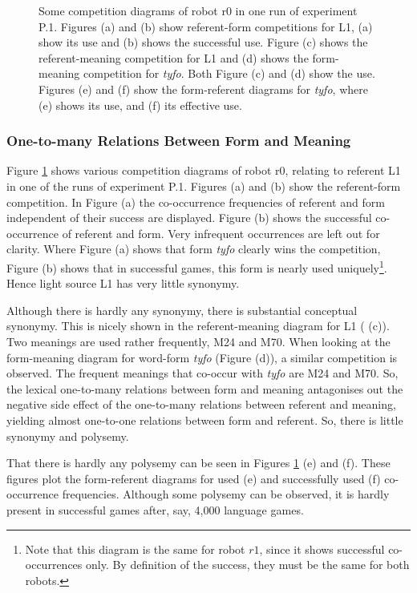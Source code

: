 \begin{figure}
\caption{Some competition diagrams of robot r0 in one run of experiment P.1. Figures (a) and (b) show referent-form competitions for L1, (a) show its use and (b) shows the successful use. Figure (c) shows the referent-meaning competition for L1 and (d) shows the form-meaning competition for {\it tyfo}. Both Figure (c) and (d) show the use. Figures (e) and (f) show the form-referent diagrams for {\it tyfo}, where (e) shows its use, and (f) its effective use.}
\label{f:opt:ggcomp1}
\end{figure}

\subsubsection{One-to-many Relations Between Form and Meaning}

Figure \ref{f:opt:ggcomp1} shows various competition diagrams of robot r0, relating to referent L1 in one of the runs of experiment P.1. Figures (a) and (b) show the referent-form competition. In Figure (a) the co-occurrence frequencies of referent and form independent of their success are displayed. Figure (b) shows the successful co-occurrence of referent and form. Very infrequent occurrences are left out for clarity. Where Figure (a) shows that form {\it tyfo} clearly wins the competition, Figure (b) shows that  in successful games, this form is nearly used uniquely\footnote{Note that this diagram is the same for robot $r1$, since it shows successful co-occurrences only. By definition of the success, they must be the same for both robots.}. Hence light source L1 has very little synonymy. 

Although there is hardly any synonymy, there is substantial conceptual synonymy. This is nicely shown in the referent-meaning diagram for L1 ( (c)). Two meanings are used rather frequently, M24 and M70. When looking at the form-meaning diagram for word-form {\it tyfo} (Figure (d)), a similar competition is observed. The frequent meanings that co-occur with {\it tyfo} are M24 and M70. So, the lexical one-to-many relations between form and meaning antagonises out the negative side effect of the one-to-many relations between referent and meaning, yielding almost one-to-one relations between form and referent. So, there is little synonymy and polysemy. 

That there is hardly any polysemy can be seen in Figures \ref{f:opt:ggcomp1} (e) and (f). These figures plot the form-referent diagrams for used (e) and successfully used (f) co-occurrence frequencies. Although some polysemy can be observed, it is hardly present in successful games after, say, 4,000 language games.


